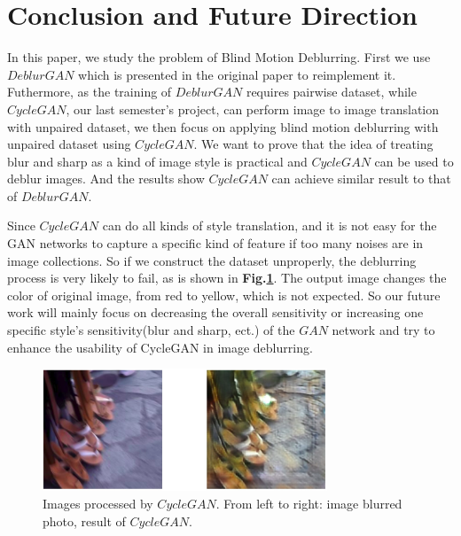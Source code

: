 \documentclass[journal]{IEEEtran}
\begin{document}
\section{Conclusion and Future Direction}
In this paper, we study the problem of Blind Motion Deblurring. First we use $DeblurGAN$ which is presented in the original paper to reimplement it. Futhermore, as the training of $DeblurGAN$ requires pairwise dataset, while $CycleGAN$, our last semester's project, can perform image to image translation with unpaired dataset, we then focus on applying blind motion deblurring with unpaired dataset using $CycleGAN$. We want to prove that the idea of treating blur and sharp as a kind of image style is practical and $CycleGAN$ can be used to deblur images. And the results show  $CycleGAN$ can achieve similar result to that of $DeblurGAN$.

Since $CycleGAN$ can do all kinds of style translation, and it is not easy for the GAN networks to capture a specific kind of feature if too many noises are in image collections. So if we construct the dataset unproperly, the deblurring process is very likely to fail, as is shown in \textbf{Fig.\ref{fig:bad}}.  The output image changes the color of original image, from red to yellow, which is not expected. So our future work will mainly focus on decreasing the overall sensitivity or increasing one specific style's sensitivity(blur and sharp, ect.) of the $GAN$ network and try to enhance the usability of CycleGAN in image deblurring.
\begin{figure}[htbp]
	\centering
	\includegraphics[width=8.5cm]{fig/bad_result.png}
	\caption{ Images processed by $CycleGAN$. From left to right: image blurred photo, result of $CycleGAN$.}
	\label{fig:bad}
\end{figure}


\ifCLASSOPTIONcaptionsoff
  \newpage
\fi



\end{document}
